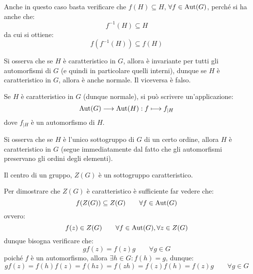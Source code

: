 \documentclass[11pt]{scrartcl}
\begin{document}
Anche in questo caso basta verificare che $f(H) \subseteq H$, $\forall f \in \operatorname{Aut}(G)$, perché si ha anche che:
    \[ f^{-1}(H) \subseteq H
        \]
da cui si ottiene:
    \[ f(f^{-1}(H)) \subseteq f(H)
        \]

\begin{remark}
    Si osserva che se $H$ è caratteristico in $G$, allora è invariante per tutti gli automorfismi di $G$ (e quindi in particolare quelli interni), dunque
    se $H$ è caratteristico in $G$, allora è anche normale. Il viceversa è falso.
\end{remark}

\begin{remark}
    Se $H$ è caratteristico in $G$ (dunque normale), si può scrivere un'applicazione:
        \[ \operatorname{Aut}(G) \longrightarrow \operatorname{Aut}(H) : f \longmapsto f_{\mid H}
            \]
    dove $f_{\mid H}$ è un automorfismo di $H$.
\end{remark}

\begin{remark}
    Si osserva che se $H$ è l'unico sottogruppo di $G$ di un certo ordine, allora $H$ è caratteristico in $G$ (segue immediatamente dal fatto che gli automorfismi
    preservano gli ordini degli elementi).
\end{remark}

\begin{exercise}
    Il centro di un gruppo, $Z(G)$ è un sottogruppo caratteristico.
\end{exercise}
        
\begin{soln}
    Per dimostrare che $Z(G)$ è caratteristico è sufficiente far vedere che:
        \[ f(Z(G)) \subseteq Z(G)
        \qquad \forall f \in \operatorname{Aut}(G)
            \]
    ovvero:
        \[ f(z) \in Z(G)
        \qquad \forall f \in \operatorname{Aut}(G), \forall z \in Z(G)
            \]
    dunque bisogna verificare che:
        \[ gf(z) = f(z)g \qquad \forall g \in G
            \]
    poiché $f$ è un automorfismo, allora $\exists h \in G : f(h) = g$, dunque:
        \[ gf(z) = f(h)f(z) = f(hz) = f(zh) = f(z)f(h) = f(z)g \qquad \forall g \in G
            \]
\end{soln}
\end{document}

